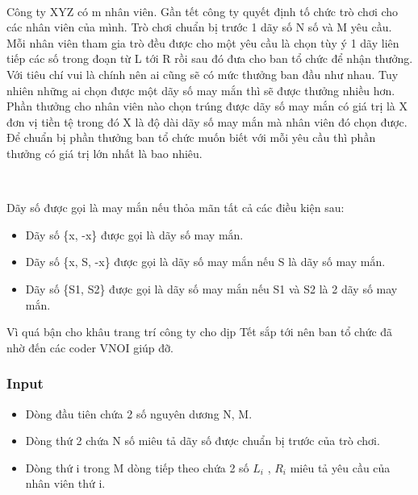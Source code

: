 

 

Công ty XYZ có m nhân viên. Gần tết công ty quyết định tố chức trò chơi cho các nhân viên của mình. Trò chơi chuẩn bị trước 1 dãy số N số và M yêu cầu. Mỗi nhân viên tham gia trò đều được cho một yêu cầu là chọn tùy ý 1 dãy liên tiếp các số trong đoạn từ L tới R rồi sau đó đưa cho ban tổ chức để nhận thưởng. Với tiêu chí vui là chính nên ai cũng sẽ có mức thưởng ban đầu như nhau. Tuy nhiên những ai chọn được một dãy số may mắn thì sẽ được thưởng nhiều hơn. Phần thưởng cho nhân viên nào chọn trúng được dãy số may mắn có giá trị là X đơn vị tiền tệ trong đó X là độ dài dãy số may mắn mà nhân viên đó chọn được. Để chuẩn bị phần thưởng ban tổ chức muốn biết với mỗi yêu cầu thì phần thưởng có giá trị lớn nhất là bao nhiêu.

 

Dãy số được gọi là may mắn nếu thỏa mãn tất cả các điều kiện sau:
\begin{itemize}
	\item 

Dãy số \{x, -x\} được gọi là dãy số may mắn.
\end{itemize}
\begin{itemize}
	\item 

Dãy số \{x, S, -x\} được gọi là dãy số may mắn nếu S là dãy số may mắn.
\end{itemize}
\begin{itemize}
	\item 

Dãy số \{S1, S2\} được gọi là dãy số may mắn nếu S1 và S2 là 2 dãy số may mắn.
\end{itemize}

Vì quá bận cho khâu trang trí công ty cho dịp Tết sắp tới nên ban tổ chức đã nhờ đến các coder VNOI giúp đỡ.

\subsubsection{Input}
\begin{itemize}
	\item Dòng đầu tiên chứa 2 số nguyên dương N, M.
	\item Dòng thứ 2 chứa N số miêu tả dãy số được chuẩn bị trước của trò chơi.
	\item Dòng thứ i trong M dòng tiếp theo chứa 2 số $L_{i}$ , $R_{i}$ miêu tả yêu cầu của nhân viên thứ i.
\end{itemize}

